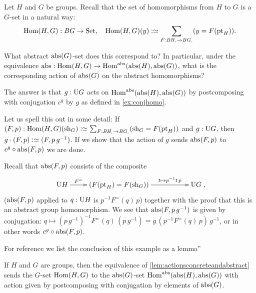 \begin{example}
  \label{ex:abstrandconj}
  Let $H$ and $G$ be groups.  Recall that the set of homomorphisms from $H$ to $G$ is a $G$-set in a natural way:
$$\Hom(H,G):\BG\to\Set,\quad \Hom(H,G)(y)\defequi \sum_{F:\BH_\div\to \BG_\div}(y=F(\pt_H)).$$

What abstract $\mathrm{abs}(G)$-set does this correspond to?
In particular, under the equivalence $\abstr:\Hom(H,G)\to\Hom^\abstr(\abstr(H),\abstr(G))$, what is the corresponding action of $\mathrm{abs}(G)$ on the abstract homomorphisms?

The answer is that $g:\mathrm{U} G$ acts on $\Hom^\abstr(\abstr(H),\abstr(G))$ by postcomposing with conjugation $c^g$ by $g$ as defined in \cref{ex:conjhomo}.  

Let us spell this out in some detail:
If $(F,p):\Hom(H,G)(\sh_G)\defequi
 \sum_{F:\BH_\div\to \BG_\div}(\sh_G=F(\pt_H))$ and $g:\mathrm{U} G$, then $g\cdot(F,p)\defequi(F,p\,g^{-1})$.  If we show that the action of $g$ sends $\mathrm{abs}(F,p)$ to $c^g\circ\mathrm{abs}(F,p)$ we are done.

Recall that $\mathrm{abs}(F,p)$ consists of the composite 
$$\xymatrix{\USym H\ar[r]^-{F^=}&(F(\pt_H)=F(\sh_G))\ar[rr]^-{t\mapsto p^{-1}t\,p}&&\USym G},$$ 
(\ie $\mathrm{abs}(F,p)$ applied to $q:\mathrm{U} H $ is  $p^{-1}F^=(q)\,p$)  together with the proof that this is an abstract group homomorphism.  
We see that $\mathrm{abs}(F,p\,g^{-1})$ is given by conjugation:
$q\mapsto(p\,g^{-1})^{-1}F^=(q)\,(p\,g^{-1})=g\,(p^{-1}F^=(q)\,p)\,g^{-1}$, or in other words $c^g\circ\mathrm{abs}(F,p)$.
\end{example}
For reference we list the conclusion of this example as a lemma''
\begin{lemma}\label{lem:abstrandconj}
  If $H$ and $G$ are groups, then the equivalence of \cref{lem:actionsconcreteandabstract} sends the $G$-set $\Hom(H,G)$ to the $\mathrm{abs}(G)$-set $\Hom^\abstr(\abstr(H),\abstr(G))$ with action given by postcomposing with conjugation by elements of $\mathrm{abs}(G)$.
\end{lemma}

